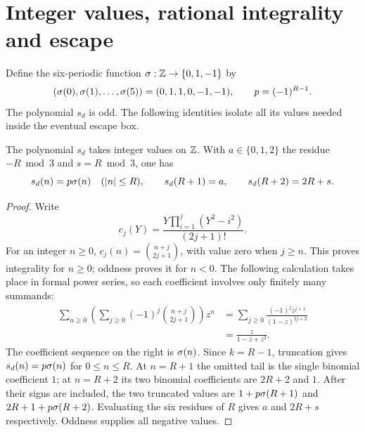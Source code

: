 \section{Integer values, rational integrality and escape}\label{sec:arithmetic}

Define the six-periodic function $\sigma:\mathbb Z\to\{0,1,-1\}$ by
\begin{equation}\label{eq:sigma}
 (\sigma(0),\sigma(1),\ldots,\sigma(5))=(0,1,1,0,-1,-1),
 \qquad p=(-1)^{R-1}.
\end{equation}
The polynomial $s_d$ is odd. The following identities isolate all its
values needed inside the eventual escape box.

\begin{lemma}\label{lem:values}
The polynomial $s_d$ takes integer values on $\mathbb Z$. With
$a\in\{0,1,2\}$ the residue $-R\bmod3$ and $s=R\bmod3$, one has
\begin{equation}\label{eq:values}
 s_d(n)=p\sigma(n)\quad(|n|\le R),\qquad
 s_d(R+1)=a,\qquad s_d(R+2)=2R+s.
\end{equation}
\end{lemma}
\begin{proof}
Write
\[
 c_j(Y)=\frac{Y\prod_{i=1}^{j}(Y^2-i^2)}{(2j+1)!}.
\]
For an integer $n\ge0$,
$c_j(n)=\binom{n+j}{2j+1}$, with value zero when $j\ge n$.
This proves integrality for $n\ge0$; oddness proves it for $n<0$.
The following calculation takes place in formal power series, so
each coefficient involves only finitely many summands:
\begin{align*}
 \sum_{n\ge0}\left(\sum_{j\ge0}(-1)^j
       \binom{n+j}{2j+1}\right)z^n
 &=\sum_{j\ge0}\frac{(-1)^jz^{j+1}}{(1-z)^{2j+2}}\\
 &=\frac{z}{1-z+z^2}.
\end{align*}
The coefficient sequence on the right is $\sigma(n)$.
Since $k=R-1$, truncation gives $s_d(n)=p\sigma(n)$ for $0\le n\le R$.
At $n=R+1$ the omitted tail is the single binomial coefficient $1$;
at $n=R+2$ its two binomial coefficients are $2R+2$ and $1$.
After their signs are included, the two truncated values are
$1+p\sigma(R+1)$ and $2R+1+p\sigma(R+2)$.
Evaluating the six residues of $R$ gives $a$ and $2R+s$ respectively.
Oddness supplies all negative values.
\end{proof}

